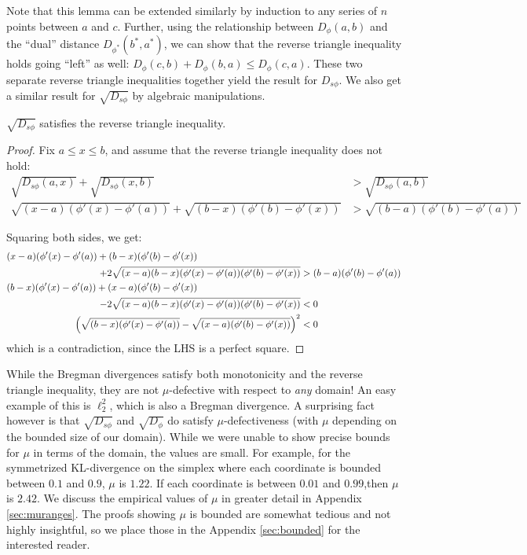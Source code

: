 \documentclass[11pt]{myclass}
\newcommand{\breg}{\ensuremath{D_\phi}}
\newcommand{\sbreg}{\ensuremath{D_{s\phi}}}
\begin{document}
Note that this lemma can be extended similarly by induction to any series of $n$ points between $a$ and $c$.
 Further, using the relationship between $\breg(a,b)$ and the ``dual'' distance  $D_{\phi^*}(b^*, a^*)$, we can show that the reverse triangle inequality holds going ``left'' as well:  
$\breg(c,b) + \breg(b,a) \leq \breg(c,a)$. These two separate reverse triangle inequalities together yield the result for  $\sbreg$. We also
get a similar result for $\sqrt{\sbreg}$ by algebraic manipulations.



\begin{lemma}\label{Aklreverse}
$\sqrt{\sbreg}$ satisfies the reverse triangle inequality.
\end{lemma}
\begin{proof}

Fix $a \le x \le b$, and assume that the reverse triangle inequality does not hold:
\begin{align*}
\sqrt{\sbreg(a,x)} + \sqrt{\sbreg(x,b)} &> \sqrt{\sbreg(a,b)} 
\\ \sqrt{(x-a) (\phi'(x) - \phi'(a))} + \sqrt{(b-x) (\phi'(b) - \phi'(x))} &> \sqrt{(b-a) (\phi'(b) - \phi'(a))} 
\end{align*}

Squaring both sides, we get:
\begin{align*}
(x-a)( \phi'(x)-\phi'(a)) + (b-x) (\phi'(b) - \phi'(x)) \hspace{1.5in}&
\\ + 2 \sqrt{(x-a)(b-x)(\phi'(x) - \phi'(a))(\phi'(b) - \phi'(x))} &> (b-a)( \phi'(b) - \phi'(a)) 
\\ (b-x)(\phi'(x) - \phi'(a)) + (x-a)(\phi'(b) - \phi'(x)) \hspace{1.5in}&
\\ - 2 \sqrt{(x-a)(b-x)(\phi'(x) - \phi'(a))(\phi'(b) - \phi'(x))} &< 0 
\\ \left( \sqrt{(b-x)(\phi'(x) - \phi'(a))} - \sqrt{(x-a)(\phi'(b) - \phi'(x))} \right)^2 &< 0
\end{align*}
which is a contradiction, since the LHS is a perfect square.
\end{proof}

 While the Bregman divergences satisfy both monotonicity and the reverse triangle inequality,
 they are not $\mu$-defective with respect to \emph{any} domain! An easy example of this is $\ell_2^2$, which is also a Bregman divergence.
A surprising fact however is that $\sqrt{\sbreg}$ and $\sqrt{\breg}$ do satisfy $\mu$-defectiveness (with $\mu$ depending on the bounded size of our domain). While we were unable to show precise bounds for $\mu$ in terms of the domain, the values are small.  For example, for the symmetrized KL-divergence on the simplex where each coordinate is bounded between $0.1$ and $0.9$, $\mu$ is $1.22$. If each coordinate is between $0.01$ and $0.99$,then $\mu$ is $2.42$. We discuss the
empirical values of $\mu$ in greater detail in Appendix \ref{sec:muranges}. The proofs showing $\mu$ is bounded are somewhat tedious and not highly insightful, so we place those in the Appendix \ref{sec:bounded} for the interested reader.
\end{document}
